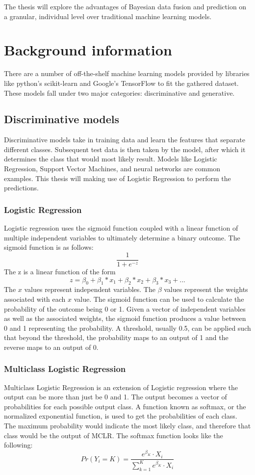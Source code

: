 \documentclass[12pt]{article}
\begin{document}
The thesis will explore the advantages of Bayesian data fusion and prediction on a granular, individual level over traditional machine learning models. 

\section{Background information}
There are a number of off-the-shelf machine learning models provided by libraries like python's scikit-learn and Google's TensorFlow to fit the gathered dataset. These models fall under two major categories: discriminative and generative. 

\subsection{Discriminative models}
Discriminative models take in training data and learn the features that separate different classes. Subsequent test data is then taken by the model, after which it determines the class that would most likely result. Models like Logistic Regression, Support Vector Machines, and neural networks are common examples. This thesis will making use of Logistic Regression to perform the predictions. 

\subsubsection{Logistic Regression}
Logistic regression uses the sigmoid function coupled with a linear function of multiple independent variables to ultimately determine a binary outcome. The sigmoid function is as follows: 
\[\frac{1}{1+e^{-z}}\]
The z is a linear function of the form
\[z = \beta_0 + \beta_1*x_1 + \beta_2*x_2 + \beta_3*x_3  + ...\]
The \(x\) values represent independent variables. The \(\beta\) values represent the weights associated with each \(x\) value. The sigmoid function can be used to calculate the probability of the outcome being 0 or 1. Given a vector of independent variables as well as the associated weights, the sigmoid function produces a value between 0 and 1 representing the probability. A threshold, usually 0.5, can be applied such that beyond the threshold, the probability maps to an output of 1 and the reverse maps to an output of 0. 

\subsubsection{Multiclass Logistic Regression}
Multiclass Logistic Regression is an extension of Logistic regression where the output can be more than just be 0 and 1. The output becomes a vector of probabilities for each possible output class. A function known as softmax, or the normalized exponential function, is used to get the probabilities of each class. The maximum probability would indicate the most likely class, and therefore that class would be the output of MCLR. The softmax function looks like the following: 
\[Pr(Y_i = K) = \frac{e^{\beta_K} \cdot X_i}{\sum_{k=1}^{K} e^{\beta_K} \cdot X_i}\]
\end{document}
